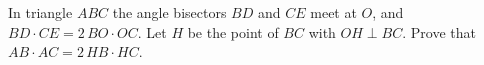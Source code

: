 In triangle $ABC$ the angle bisectors $BD$ and $CE$ meet at $O$, and $BD\cdot CE=2\,BO\cdot OC$. Let $H$ be the point of $BC$ with $OH\perp BC$. Prove that $AB\cdot AC=2\,HB\cdot HC$.
